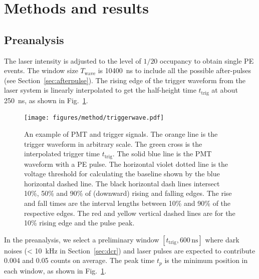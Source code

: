 \section{Methods and results}
\label{Method}
\subsection{Preanalysis}
\label{sec:laserstage}

The laser intensity is adjusted to the level of $1/20$ occupancy to obtain single PE events. The window size $T_{\mathrm{wave}}$ is \SI{10400}{ns} to include all the possible after-pulses (see Section~\ref{sec:afterpulse}). The rising edge of the trigger waveform from the laser system is linearly interpolated to get the half-height time $t_{\mathrm{trig}}$ at about \SI{250}{ns}, as shown in Fig.~\ref{fig:triggertime}.
\begin{figure}[!htbp]
    \centering
    \texttt{[image: figures/method/triggerwave.pdf]}
    \caption{An example of PMT and trigger signals. The orange line is the trigger waveform in arbitrary scale. The green cross is the interpolated trigger time $t_{\mathrm{trig}}$. The solid blue line is the PMT waveform with a PE pulse. The horizontal violet dotted line is the voltage threshold for calculating the baseline shown by the blue horizontal dashed line. The black horizontal dash lines intersect 10\%, 50\% and 90\% of (downward) rising and falling edges. The rise and fall times are the interval lengths between 10\% and 90\% of the respective edges. The red and yellow vertical dashed lines are for the 10\% rising edge and the pulse peak.}
    \label{fig:triggertime}
\end{figure}


In the preanalysis, we select a preliminary window $[t_{\mathrm{trig}},600\,\mathrm{ns}]$ where dark noises (\SI{< 10}{kHz} in Section~\ref{sec:dcr}) and laser pulses are expected to contribute 0.004 and 0.05 counts on average. The peak time $t_p$ is the minimum position in each window, as shown in Fig.~\ref{fig:triggertime}.


